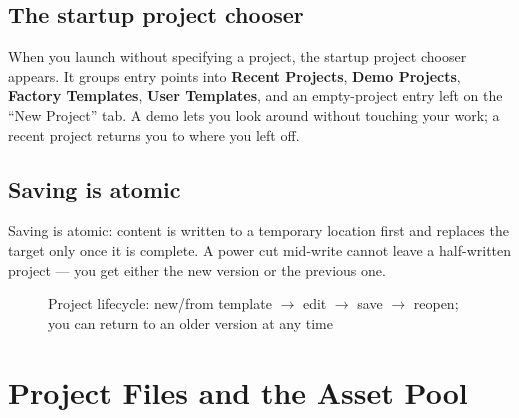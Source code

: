 
\subsection{The startup project chooser}

When you launch without specifying a project, the startup project chooser appears.
It groups entry points into \textbf{Recent Projects}, \textbf{Demo Projects},
\textbf{Factory Templates}, \textbf{User Templates}, and an empty-project entry left
on the ``New Project'' tab. A demo lets you look around without touching your work;
a recent project returns you to where you left off.


\subsection{Saving is atomic}

Saving is atomic: content is written to a temporary location first and replaces the
target only once it is complete. A power cut mid-write cannot leave a half-written
project — you get either the new version or the previous one.

\begin{figure}[htbp]
\centering
{}
\caption{Project lifecycle: new/from template $\to$ edit $\to$ save $\to$ reopen; you can return to an older version at any time}
\label{fig:ch02-lifecycle}
\end{figure}

\section{Project Files and the Asset Pool}

